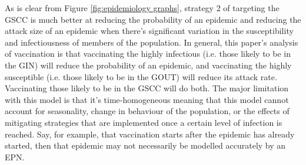 As is clear from Figure \ref{fig:epidemiology graphs}, strategy 2 of targeting the GSCC is much better at reducing the probability of an epidemic and reducing the attack size of an
epidemic when there's significant variation in the susceptibility and infectiousness of members of the
population. In general, this paper's analysis of vaccination is that vaccinating the highly infectious (i.e. those likely to be in the GIN) will reduce the probability of an
epidemic, and vaccinating the highly susceptible (i.e. those likely to be in the GOUT) will reduce its attack rate. Vaccinating those likely to be in the GSCC will do both. The
major limitation with this model is that it's time-homogeneous meaning that this model cannot account for seasonality, change in behaviour of the population, or the effects of
mitigating strategies that are implemented once a certain level of infection is reached. Say, for example, that vaccination starts after the epidemic has already started, then that
epidemic may not necessarily be modelled accurately by an EPN.
